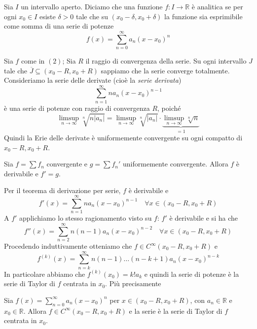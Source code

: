 \begin{definition}
    Sia \(I\) un intervallo aperto. Diciamo che una funzione \(f: I \to
    \mathbb{R}\) è analitica se per ogni \(x_{0} \in I\) esiste \(\delta > 0\)
    tale che su \((x_{0} - \delta, x_{0} + \delta)\) la funzione sia esprimibile
    come somma di una serie di potenze 
    \begin{equation}
        f(x) = \sum_{n=0}^{\infty} a_{n} {(x - x_{0})}^{n} 
    \end{equation}
\end{definition}
Sia \(f\) come in \((2)\); Sia \(R\) il raggio di convergenza della serie. Su
ogni intervallo \(J\) tale che \(\overline{J} \subseteq (x_{0} - R, x_{0} + R)
\) sappiamo che la serie converge totalmente. Consideriamo la serie delle
derivate (cioè la \emph{serie derivata})
\[
    \sum_{n=1}^{\infty} n a_{n} {(x - x_{0})}^{n-1} 
\]
è una serie di potenze con raggio di convergenza \(R\), poiché 
\[
    \limsup_{n \to \infty} \sqrt[n]{n|a_{n}|} = \limsup_{n \to \infty}
    \sqrt[n]{|a_{n}|} \cdot \underbrace{\limsup_{n \to \infty} \sqrt[n]{n}}_{=1}
\]
Quindi la Erie delle derivate è uniformemente convergente su ogni compatto di
\(x_{0}-R, x_{0}+R\). 
\begin{lemma}
    Sia \(f = \sum f_{n}\) convergente e \(g = \sum f_{n}' \) uniformemente
    convergente. Allora \(f\) è derivabile e \(f' = g\).
\end{lemma}
Per il teorema di derivazione per serie, \(f\) è derivabile e
\[
    f'(x) = \sum_{n=1}^{\infty} n a_{n} {(x - x_{0})}^{n-1} \quad \forall x \in
    (x_{0} - R, x_{0}+R)
\]
A \(f'\) applichiamo lo stesso ragionamento visto su \(f\): \(f'\) è derivabile
e si ha che 
\[
    f''(x) = \sum_{n=2}^{\infty} n(n-1) a_{n} {(x - x_{0})}^{n-2} \quad \forall
    x \in (x_{0} - R, x_{0}+R)
\]
Procedendo induttivamente otteniamo che \(f \in C^{\infty}(x_{0} - R, x_{0}+R)\)
e
\[
    f^{(k)}(x) = \sum_{n=k}^{\infty} n(n-1) \dots (n-k+1) a_{n} {(x -
    x_{0})}^{n-k}
\]
In particolare abbiamo che \(\displaystyle f^{(k)}(x_{0}) = k! a_k\) e quindi la
serie di potenze è la serie di Taylor di \(f\) centrata in \(x_{0}\). Più
precisamente
\begin{theorem}
    Sia \(\displaystyle f(x) = \sum_{n=0}^{\infty} a_{n} {(x-x_{0})}^{n} \) per
    \(x \in (x_{0} -R, x_{0} + R)\), con \(a_{n} \in \mathbb{R}\) e \(x_{0} \in
    \mathbb{R}\). Allora \(f \in C^{\infty}(x_{0}-R, x_{0}+R)\) e la serie è la
    serie di Taylor di \(f\) centrata in \(x_{0}\).
\end{theorem}
